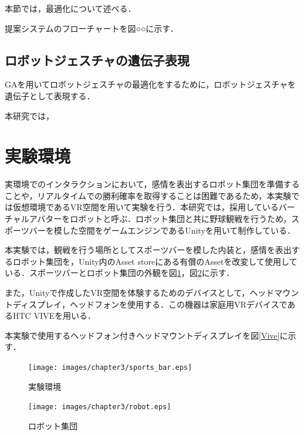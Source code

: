 本節では，最適化について述べる．

提案システムのフローチャートを図○○に示す．


\subsection{ロボットジェスチャの遺伝子表現}
\label{sec3.1.3}
GAを用いてロボットジェスチャの最適化をするために，ロボットジェスチャを遺伝子として表現する．

本研究では，


\newpage

\section{実験環境}
\label{sec3.2}

実環境でのインタラクションにおいて，感情を表出するロボット集団を準備することや，リアルタイムでの勝利確率を取得することは困難であるため，本実験では仮想環境であるVR空間を用いて実験を行う．本研究では，採用しているバーチャルアバターをロボットと呼ぶ．ロボット集団と共に野球観戦を行うため，スポーツバーを模した空間をゲームエンジンであるUnityを用いて制作している\cite{unity}．

本実験では，観戦を行う場所としてスポーツバーを模した内装と，感情を表出するロボット集団を，Unity内のAsset storeにある有償のAssetを改変して使用している\cite{bar}\cite{lilrobot}．スポーツバーとロボット集団の外観を図\ref{sports_bar}，図\ref{robot}に示す．

また，Unityで作成したVR空間を体験するためのデバイスとして，ヘッドマウントディスプレイ，ヘッドフォンを使用する．この機器は家庭用VRデバイスであるHTC VIVEを用いる\cite{vive}．

本実験で使用するヘッドフォン付きヘッドマウントディスプレイを図\ref{Vive}に示す．


\vspace{1cm}
 \begin{figure}[H]
 \begin{center}
  \centering
  \texttt{[image: images/chapter3/sports\_bar.eps]}
  \caption{実験環境}
  \label{sports_bar}
 \end{center}
\end{figure}


\newpage

\vspace{1cm}
 \begin{figure}[!h]
 \begin{center}
  \centering
  \texttt{[image: images/chapter3/robot.eps]}
  \caption{ロボット集団}
  \label{robot}
 \end{center}
\end{figure}


